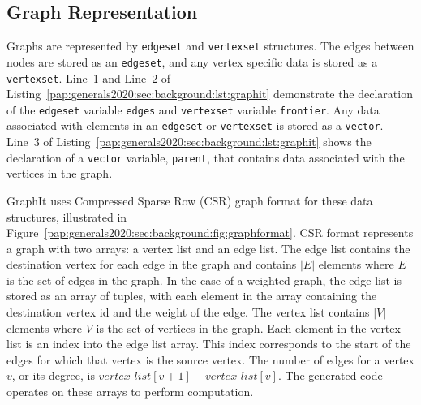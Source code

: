 \subsection{Graph Representation}
Graphs are represented by \lstinline[language=graphit]{edgeset} and \lstinline[language=graphit]{vertexset} structures.
The edges between nodes are stored as an \lstinline[language=graphit]{edgeset}, and any vertex specific data is stored as a \lstinline[language=graphit]{vertexset}.
Line~1 and Line~2 of Listing~\ref{pap:generals2020:sec:background:lst:graphit} demonstrate the declaration of the \lstinline[language=graphit]{edgeset} variable \lstinline[language=graphit]{edges} and  \lstinline[language=graphit]{vertexset} variable \lstinline[language=graphit]{frontier}. 
Any data associated with elements in an \lstinline[language=graphit]{edgeset} or \lstinline[language=graphit]{vertexset} is stored as a \lstinline[language=graphit]{vector}.
Line~3 of Listing~\ref{pap:generals2020:sec:background:lst:graphit} shows the declaration of a \lstinline[language=graphit]{vector} variable, \lstinline[language=graphit]{parent}, that contains data associated with the vertices in the graph.

GraphIt uses Compressed Sparse Row (CSR) graph format for these data structures, illustrated in Figure~\ref{pap:generals2020:sec:background:fig:graphformat}.
CSR format represents a graph with two arrays: a vertex list and an edge list.
The edge list contains the destination vertex for each edge in the graph and contains $|E|$ elements where $E$ is the set of edges in the graph.
In the case of a weighted graph, the edge list is stored as an array of tuples, with each element in the array containing the destination vertex id and the weight of the edge.
The vertex list contains $|V|$ elements where $V$ is the set of vertices in the graph. 
Each element in the vertex list is an index into the edge list array.
This index corresponds to the start of the edges for which that vertex is the source vertex.
The number of edges for a vertex $v$, or its degree, is $vertex\_list[v+1] - vertex\_list[v]$.
The generated code operates on these arrays to perform computation.

\graphformatfig



